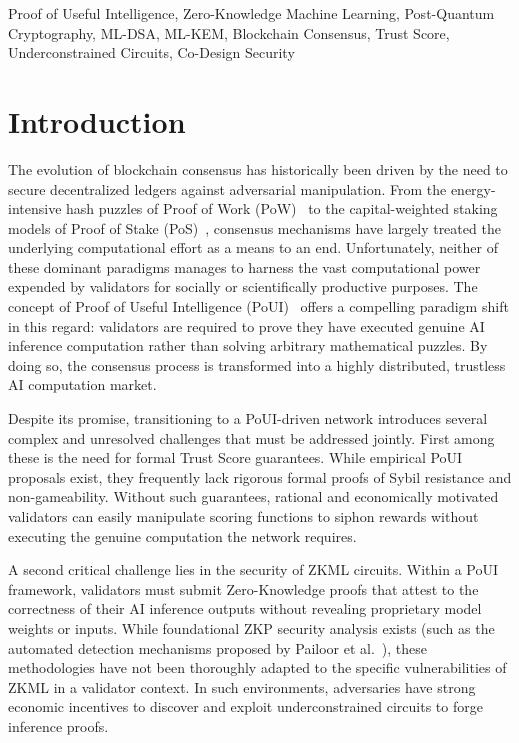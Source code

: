 \documentclass[journal]{IEEEtran}
\begin{document}
\begin{IEEEkeywords}
Proof of Useful Intelligence, Zero-Knowledge Machine Learning, Post-Quantum Cryptography, ML-DSA, ML-KEM, Blockchain Consensus, Trust Score, Underconstrained Circuits, Co-Design Security
\end{IEEEkeywords}

\section{Introduction}
\label{sec:intro}

The evolution of blockchain consensus has historically been driven by the need to secure decentralized ledgers against adversarial manipulation. From the energy-intensive hash puzzles of Proof of Work (PoW)~\cite{nakamoto2008} to the capital-weighted staking models of Proof of Stake (PoS)~\cite{buterin2020eth}, consensus mechanisms have largely treated the underlying computational effort as a means to an end. Unfortunately, neither of these dominant paradigms manages to harness the vast computational power expended by validators for socially or scientifically productive purposes. The concept of Proof of Useful Intelligence (PoUI)~\cite{chong2025poui} offers a compelling paradigm shift in this regard: validators are required to prove they have executed genuine AI inference computation rather than solving arbitrary mathematical puzzles. By doing so, the consensus process is transformed into a highly distributed, trustless AI computation market.

Despite its promise, transitioning to a PoUI-driven network introduces several complex and unresolved challenges that must be addressed jointly. First among these is the need for formal Trust Score guarantees. While empirical PoUI proposals exist, they frequently lack rigorous formal proofs of Sybil resistance and non-gameability. Without such guarantees, rational and economically motivated validators can easily manipulate scoring functions to siphon rewards without executing the genuine computation the network requires.

A second critical challenge lies in the security of ZKML circuits. Within a PoUI framework, validators must submit Zero-Knowledge proofs that attest to the correctness of their AI inference outputs without revealing proprietary model weights or inputs. While foundational ZKP security analysis exists (such as the automated detection mechanisms proposed by Pailoor et al.~\cite{pailoor2023ccs}), these methodologies have not been thoroughly adapted to the specific vulnerabilities of ZKML in a validator context. In such environments, adversaries have strong economic incentives to discover and exploit underconstrained circuits to forge inference proofs.
\end{document}
